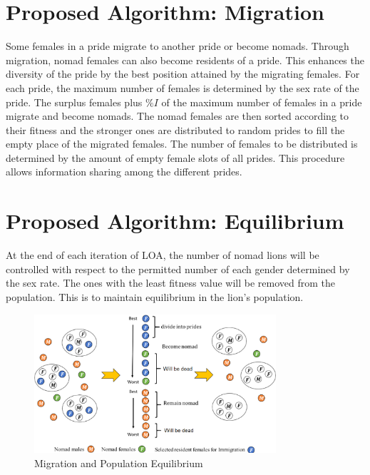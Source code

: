 \section{Proposed Algorithm: Migration}
Some females in a pride migrate to another pride or become nomads. Through migration, nomad females can also become residents of a pride. This enhances the diversity of the pride by the best position attained by the migrating females. For each pride, the maximum number of females is determined by the sex rate of the pride. The surplus females plus $\%I$ of the maximum number of females in a pride migrate and become nomads. The nomad females are then sorted according to their fitness and the stronger ones are distributed to random prides to fill the empty place of the migrated females. The number of females to be distributed is determined by the amount of empty female slots of all prides. This procedure allows information sharing among the different prides.

\section{Proposed Algorithm: Equilibrium}
At the end of each iteration of LOA, the number of nomad lions will be controlled with respect to the permitted number of each gender determined by the sex rate. The ones with the least fitness value will be removed from the population. This is to maintain equilibrium in the lion's population.

\begin{figure}[H]
\begin{center}
\includegraphics[width=0.8\textwidth]{img/equilibrium/equilibrium}
\caption{Migration and Population Equilibrium \cite{loa_2016}}
\end{center}
\end{figure}

